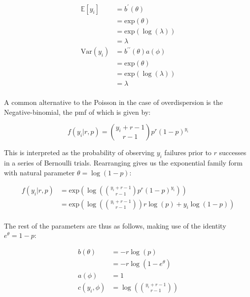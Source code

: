 \documentclass{report}
\begin{document}
\begin{equation}\label{eq:ex-glm-poisson-dist-mean-var}
    \begin{aligned}
        \mathbb{E}[y_i] 
          &= b^\prime(\theta) \\
          &= \text{exp}(\theta) \\
          &= \text{exp}(\log(\lambda)) \\
          &= \lambda \\
        \text{Var}(y_i)
          &= b^{\prime\prime}(\theta)a(\phi) \\
          &= \text{exp}(\theta) \\
          &= \text{exp}(\log(\lambda)) \\
          &= \lambda \\
    \end{aligned}
\end{equation}

A common alternative to the Poisson in the case of overdispersion is the Negative-binomial, the \gls{pmf} of which is given by:

\begin{equation}\label{eq:ex-glm-nb-dist}
    f(y_i|r, p) = \binom{y_i+r-1}{r-1} p^r (1-p)^{y_i}
\end{equation}

This is interpreted as the probability of observing $y_i$ failures prior to $r$ successes in a series of Bernoulli trials. Rearranging gives us the exponential family form with natural parameter $\theta = \log(1-p)$:

\begin{equation}\label{eq:ex-glm-nb-dist-exp-form}
    \begin{aligned}
        f(y_i|r,p)
          &= \text{exp}\left(\log\left(\binom{y_i+r-1}{r-1} p^r (1-p)^{y_i}\right)\right) \\
          &= \text{exp}\left(\log\left(\binom{y_i+r-1}{r-1}\right) r\log(p) + y_i\log(1-p)\right) \\
    \end{aligned}
\end{equation}

The rest of the parameters are thus as follows, making use of the identity $e^\theta = 1 - p$:

\begin{equation}\label{eq:exp-glm-nb-dist-params}
    \begin{aligned}
        b(\theta)
          &= -r\log(p) \\
          &= -r\log(1 - e^\theta) \\
        a(\phi) &= 1 \\
        c(y_i, \phi) &= \log\left(\binom{y_i+r-1}{r-1}\right) \\
    \end{aligned}
\end{equation}
\end{document}

